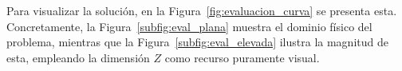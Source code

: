 \documentclass[11pt]{book}
\theoremstyle{plain} %
\theoremstyle{definition} %
\theoremstyle{definition} %
\begin{document}
%
Para visualizar la solución, en la Figura~\ref{fig:evaluacion_curva} se presenta esta. Concretamente, la Figura~\ref{subfig:eval_plana} muestra el dominio físico del problema, mientras que la Figura~\ref{subfig:eval_elevada} ilustra la magnitud de esta, empleando la dimensión $Z$ como recurso puramente visual.
\end{document}

